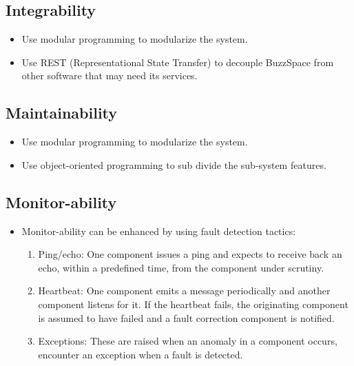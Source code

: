 \subsection{Integrability}
	\begin{itemize}
		\item Use modular programming to modularize the system. 
		\item Use REST (Representational State Transfer) to decouple BuzzSpace from other software that may need its services.
	\end{itemize}
\subsection{Maintainability}
	\begin{itemize}
		\item Use modular programming to modularize the system.
		\item Use object-oriented programming to sub divide the sub-system features.
	\end{itemize}
\subsection{Monitor-ability}
	\begin{itemize}
		\item Monitor-ability can be enhanced by using fault detection tactics:
		\begin{enumerate}
			\item Ping/echo: One component issues a ping and expects to receive back an echo, within a predefined time, from the component under scrutiny.
			\item Heartbeat: One component emits a message periodically and another component listens for it. If the heartbeat fails, the originating component is assumed to have failed and a fault correction component is notified.
			\item Exceptions: These are raised when an anomaly in a component occurs, encounter an exception when a fault is detected.
		\end{enumerate}
	\end{itemize}
